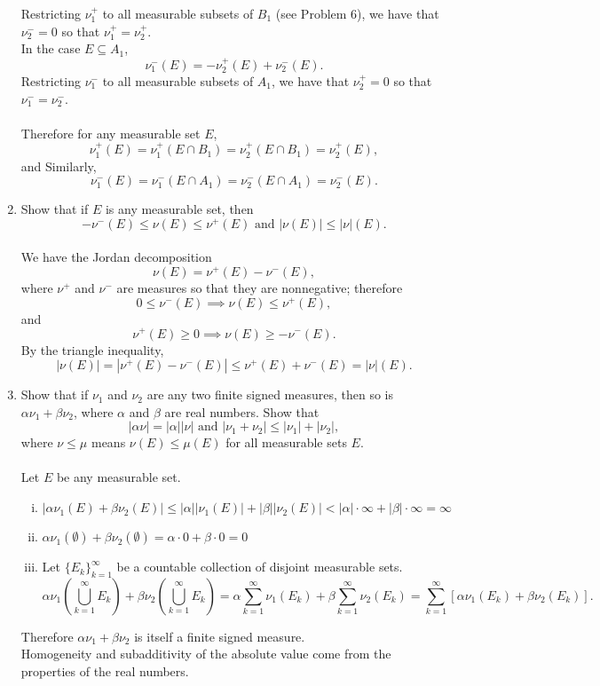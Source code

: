 \begin{enumerate}
\[	\]
	Restricting $\nu_1^+$ to all measurable subsets of $B_1$ (see Problem 6), we have that $\nu_2^-=0$ so that $\nu_1^+=\nu_2^+$.
	\\In the case $E\subseteq A_1$,
	\[
		\nu_1^-(E)=-\nu_2^+(E)+\nu_2^-(E).
	\]
	Restricting $\nu_1^-$ to all measurable subsets of $A_1$, we have that $\nu_2^+=0$ so that $\nu_1^-=\nu_2^-$.\\
	\\Therefore for any measurable set $E$,
	\[
		\nu_1^+(E)=\nu_1^+(E\cap B_1)=\nu_2^+(E\cap B_1)=\nu_2^+(E),
	\]
	and Similarly,
	\[
		\nu_1^-(E)=\nu_1^-(E\cap A_1)=\nu_2^-(E\cap A_1)=\nu_2^-(E).
	\]
	\item Show that if $E$ is any measurable set, then
	\[
		-\nu^-(E)\le\nu(E)\le\nu^+(E)\text{ and }|\nu(E)|\le|\nu|(E).	
	\]
	\\We have the Jordan decomposition
	\[
		\nu(E)=\nu^+(E)-\nu^-(E),
	\]
	where $\nu^+$ and $\nu^-$ are measures so that they are nonnegative; therefore
	\[
		0\le\nu^-(E)\implies \nu(E)\le\nu^+(E),
	\]
	and
	\[
		\nu^+(E)\ge0\implies \nu(E)\ge-\nu^-(E).
	\]
	By the triangle inequality,
	\[
		|\nu(E)|=|\nu^+(E)-\nu^-(E)|\le\nu^+(E)+\nu^-(E)=|\nu|(E).
	\]
	\item Show that if $\nu_1$ and $\nu_2$ are any two finite signed measures, then so is $\alpha\nu_1+\beta\nu_2$, where $\alpha$ and $\beta$ are real numbers. Show that
	\[
		|\alpha\nu|=|\alpha||\nu|\text{ and }|\nu_1+\nu_2|\le|\nu_1|+|\nu_2|,
	\]
	where $\nu\le\mu$ means $\nu(E)\le\mu(E)$ for all measurable sets $E$.\\
	\\Let $E$ be any measurable set.
	\begin{enumerate}[(i)]
		\item $|\alpha\nu_1(E)+\beta\nu_2(E)|\le|\alpha||\nu_1(E)|+|\beta||\nu_2(E)|<|\alpha|\cdot\infty+|\beta|\cdot\infty=\infty$
		\item $\alpha\nu_1(\emptyset)+\beta\nu_2(\emptyset)=\alpha\cdot0+\beta\cdot0=0$
		\item Let $\{E_k\}_{k=1}^\infty$ be a countable collection of disjoint measurable sets.
		\[
			\alpha\nu_1(\bigcup_{k=1}^\infty E_k)+\beta\nu_2(\bigcup_{k=1}^\infty E_k)=\alpha\sum_{k=1}^\infty\nu_1(E_k)+\beta\sum_{k=1}^\infty\nu_2(E_k)=\sum_{k=1}^\infty\left[\alpha\nu_1(E_k)+\beta\nu_2(E_k)\right].
		\]
	\end{enumerate}
	Therefore $\alpha\nu_1+\beta\nu_2$ is itself a finite signed measure.
	\\Homogeneity and subadditivity of the absolute value come from the properties of the real numbers. 

\end{enumerate}
